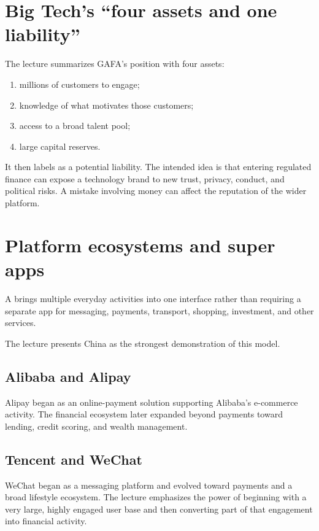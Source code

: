 \section{Big Tech's ``four assets and one liability''}

The lecture summarizes GAFA's position with four assets:

\begin{enumerate}
  \item millions of customers to engage;
  \item knowledge of what motivates those customers;
  \item access to a broad talent pool;
  \item large capital reserves.
\end{enumerate}

It then labels  as a potential liability. The intended idea is that entering regulated finance can expose a technology brand to new trust, privacy, conduct, and political risks. A mistake involving money can affect the reputation of the wider platform.

\section{Platform ecosystems and super apps}

A  brings multiple everyday activities into one interface rather than requiring a separate app for messaging, payments, transport, shopping, investment, and other services.

The lecture presents China as the strongest demonstration of this model.

\subsection{Alibaba and Alipay}

Alipay began as an online-payment solution supporting Alibaba's e-commerce activity. The financial ecosystem later expanded beyond payments toward lending, credit scoring, and wealth management.

\subsection{Tencent and WeChat}

WeChat began as a messaging platform and evolved toward payments and a broad lifestyle ecosystem. The lecture emphasizes the power of beginning with a very large, highly engaged user base and then converting part of that engagement into financial activity.

